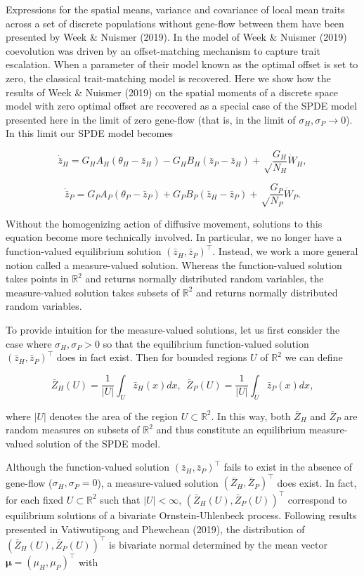 \documentclass{article}
\begin{document}
Expressions for the spatial means, variance and covariance of local mean
traits across a set of discrete populations without gene-flow between
them have been presented by Week \& Nuismer (2019). In the model of Week
\& Nuismer (2019) coevolution was driven by an offset-matching mechanism
to capture trait escalation. When a parameter of their model known as
the optimal offset is set to zero, the classical trait-matching model is
recovered. Here we show how the results of Week \& Nuismer (2019) on the
spatial moments of a discrete space model with zero optimal offset are
recovered as a special case of the SPDE model presented here in the
limit of zero gene-flow (that is, in the limit of
\(\sigma_H,\sigma_P\to0\)). In this limit our SPDE model becomes

\[\dot{\bar z}_H=G_HA_H(\theta_H-\bar z_H)-G_HB_H(\bar z_P-\bar z_H)+\sqrt\frac{G_H}{N_H}\dot W_H,\]

\[\dot{\bar z}_P=G_PA_P(\theta_P-\bar z_P)+G_PB_P(\bar z_H-\bar z_P)+\sqrt\frac{G_P}{N_P}\dot W_P.\]

Without the homogenizing action of diffusive movement, solutions to this
equation become more technically involved. In particular, we no longer
have a function-valued equilibrium solution
\((\bar z_H,\bar z_P)^\top\). Instead, we work a more general notion
called a measure-valued solution. Whereas the function-valued solution
takes points in \(\mathbb R^2\) and returns normally distributed random
variables, the measure-valued solution takes subsets of \(\mathbb R^2\)
and returns normally distributed random variables.

To provide intuition for the measure-valued solutions, let us first
consider the case where \(\sigma_H,\sigma_P>0\) so that the equilibrium
function-valued solution \((\bar z_H,\bar z_P)^\top\) does in fact
exist. Then for bounded regions \(U\) of \(\mathbb R^2\) we can define

\[\bar Z_H(U)=\frac{1}{|U|}\int_U\bar z_H(x)dx, \ \ \bar Z_P(U)=\frac{1}{|U|}\int_U\bar z_P(x)dx,\]

where \(|U|\) denotes the area of the region \(U\subset\mathbb R^2\). In
this way, both \(\bar Z_H\) and \(\bar Z_P\) are random measures on
subsets of \(\mathbb R^2\) and thus constitute an equilibrium
measure-valued solution of the SPDE model.

Although the function-valued solution \((\bar z_H,\bar z_P)^\top\) fails
to exist in the absence of gene-flow (\(\sigma_H,\sigma_P=0\)), a
measure-valued solution \((\bar Z_H,\bar Z_P)^\top\) does exist. In
fact, for each fixed \(U\subset\mathbb R^2\) such that \(|U|<\infty\),
\((\bar Z_H(U),\bar Z_P(U))^\top\) correspond to equilibrium solutions
of a bivariate Ornstein-Uhlenbeck process. Following results presented
in Vatiwutipong and Phewchean (2019), the distribution of
\((\bar Z_H(U),\bar Z_P(U))^\top\) is bivariate normal determined by the
mean vector \(\pmb\mu=(\mu_H,\mu_P)^\top\) with
\end{document}
